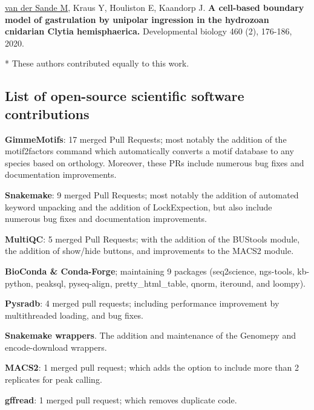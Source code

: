 \noindent
\underline{van der Sande M}, Kraus Y, Houliston E, Kaandorp J. \textbf{A cell-based boundary model of gastrulation by unipolar ingression in the hydrozoan cnidarian Clytia hemisphaerica.}  Developmental biology 460 (2), 176-186, 2020. \cite{vanderSande2020}
\newline

\noindent
* These authors contributed equally to this work.

\newpage
\subsection{List of open-source scientific software contributions}

\noindent
\textbf{GimmeMotifs}: 17 merged Pull Requests; most notably the addition of the motif2factors command which automatically converts a motif database to any species based on orthology. Moreover, these PRs include numerous bug fixes and documentation improvements.
\newline

\noindent
\textbf{Snakemake}: 9 merged Pull Requests; most notably the addition of automated keyword unpacking and the addition of LockExpection, but also include numerous bug fixes and documentation improvements.
\newline

\noindent
\textbf{MultiQC}: 5 merged Pull Requests; with the addition of the BUStools module, the addition of show/hide buttons, and improvements to the MACS2 module. 
\newline

\noindent
\textbf{BioConda \& Conda-Forge}; maintaining 9 packages (seq2science, ngs-tools, kb-python, peaksql, pyseq-align, pretty\_html\_table, qnorm, iteround, and loompy).
\newline

\noindent
\textbf{Pysradb}: 4 merged pull requests; including performance improvement by multithreaded loading, and bug fixes.
\newline

\noindent
\textbf{Snakemake wrappers}. The addition and maintenance of the Genomepy and encode-download wrappers.
\newline

\noindent
\textbf{MACS2}: 1 merged pull request; which adds the option to include more than 2 replicates for peak calling.
\newline

\noindent
\textbf{gffread}: 1 merged pull request; which removes duplicate code.
\newline

